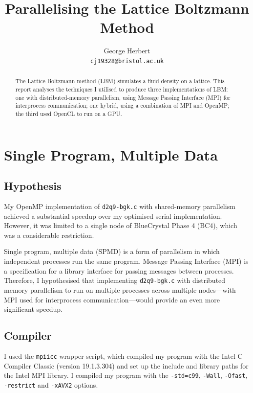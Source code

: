 \documentclass[twocolumn, a4paper]{article}
\author{
  George Herbert\\
  \texttt{cj19328@bristol.ac.uk}
}
\title{\vspace{-2em}Parallelising the Lattice Boltzmann Method}
\begin{document}
\maketitle

\begin{abstract}
  The Lattice Boltzmann method (LBM) simulates a fluid density on a lattice.
  This report analyses the techniques I utilised to produce three implementations of LBM: one with distributed-memory parallelism, using Message Passing Interface (MPI) for interprocess communication; one hybrid, using a combination of MPI and OpenMP; the third used OpenCL to run on a GPU.
\end{abstract}

\section{Single Program, Multiple Data}

\subsection{Hypothesis}

My OpenMP implementation of \texttt{d2q9-bgk.c} with shared-memory parallelism achieved a substantial speedup over my optimised serial implementation.
However, it was limited to a single node of BlueCrystal Phase 4 (BC4), which was a considerable restriction.

Single program, multiple data (SPMD) is a form of parallelism in which independent processes run the same program.
Message Passing Interface (MPI) is a specification for a library interface for passing messages between processes.
Therefore, I hypothesised that implementing \texttt{d2q9-bgk.c} with distributed memory parallelism to run on multiple processes across multiple nodes---with MPI used for interprocess communication---would provide an even more significant speedup.

\subsection{Compiler}

I used the \texttt{mpiicc} wrapper script, which compiled my program with the Intel C Compiler Classic (version 19.1.3.304) and set up the include and library paths for the Intel MPI library.
I compiled my program with the \texttt{-std=c99}, \texttt{-Wall}, \texttt{-Ofast}, \texttt{-restrict} and \texttt{-xAVX2} options.
\end{document}
